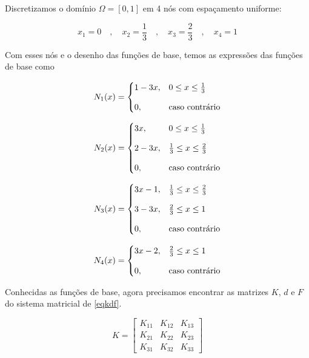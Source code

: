 \documentclass[12pt]{scrartcl}
\begin{document}
Discretizamos o domínio $\Omega = \left[0, 1\right]$ em 4 nós com espaçamento uniforme:

\[
    x_1 = 0 \quad , \quad x_2 = \frac{1}{3} \quad , \quad x_3 = \frac{2}{3} \quad , \quad x_4 = 1
\]

Com esses nós e o desenho das funções de base, temos as expressões das funções de base como

\[
    N_1(x) = \begin{cases}
        1 - 3x, & 0 \leq x \leq \frac{1}{3} \\
        \noalign{\vskip9pt}
        0,      & \textrm{caso contrário}
    \end{cases}
\]

\[
    N_2(x) = \begin{cases}
        3x,     & 0 \leq x \leq \frac{1}{3}           \\
        \noalign{\vskip9pt}
        2 - 3x, & \frac{1}{3} \leq x \leq \frac{2}{3} \\
        \noalign{\vskip9pt}
        0,      & \textrm{caso contrário}
    \end{cases}
\]

\[
    N_3(x) = \begin{cases}
        3x - 1, & \frac{1}{3} \leq x \leq \frac{2}{3} \\
        \noalign{\vskip9pt}
        3 - 3x, & \frac{2}{3} \leq x \leq 1           \\
        \noalign{\vskip9pt}
        0,      & \textrm{caso contrário}
    \end{cases}
\]

\[
    N_4(x) = \begin{cases}
        3x - 2, & \frac{2}{3} \leq x \leq 1 \\
        \noalign{\vskip9pt}
        0,      & \textrm{caso contrário}
    \end{cases}
\]

Conhecidas as funções de base, agora precisamos encontrar as matrizes $K$, $d$ e $F$ do sistema matricial de \eqref{eqkdf}.

\begingroup
\renewcommand*{\arraystretch}{2}

\[
    K =
    \begin{bmatrix}
        K_{11} & K_{12} & K_{13} \\
        K_{21} & K_{22} & K_{23} \\
        K_{31} & K_{32} & K_{33}
    \end{bmatrix}
\]

\endgroup
\end{document}
